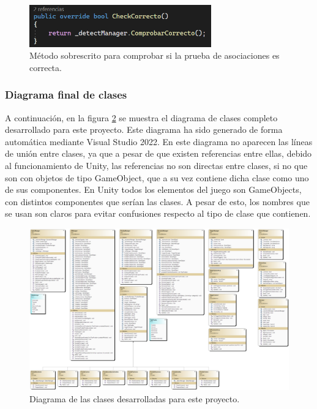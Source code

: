 \begin{figure}
	\centering
	\includegraphics[width=0.7\textwidth]{04.Desarrollo/05.Entrega5/01.Iteracion5_1/00.Figuras/19.check_correcto.png}
	\caption{Método sobrescrito para comprobar si la prueba de asociaciones es correcta.}
	\label{fig:checkCorrecto}
\end{figure}





\subsubsection{Diagrama final de clases}

A continuación, en la figura \ref{fig:diagramaClases} se muestra el diagrama de clases completo desarrollado para este proyecto. Este diagrama ha sido generado de forma automática mediante Visual Studio 2022. En este diagrama no aparecen las líneas de unión entre clases, ya que a pesar de que existen referencias entre ellas, debido al funcionamiento de Unity, las referencias no son directas entre clases, si no que son con objetos de tipo GameObject, que a su vez contiene dicha clase como uno de sus componentes. En Unity todos los elementos del juego son GameObjects, con distintos componentes que serían las clases. A pesar de esto, los nombres que se usan son claros para evitar confusiones respecto al tipo de clase que contienen.

\begin{figure}[H]
	\centering
	\includegraphics[width=1.5\textwidth, angle=-90]{04.Desarrollo/05.Entrega5/01.Iteracion5_1/00.Figuras/09.diagrama_clases.png}
	\caption{Diagrama de las clases desarrolladas para este proyecto.}
	\label{fig:diagramaClases}
\end{figure}




